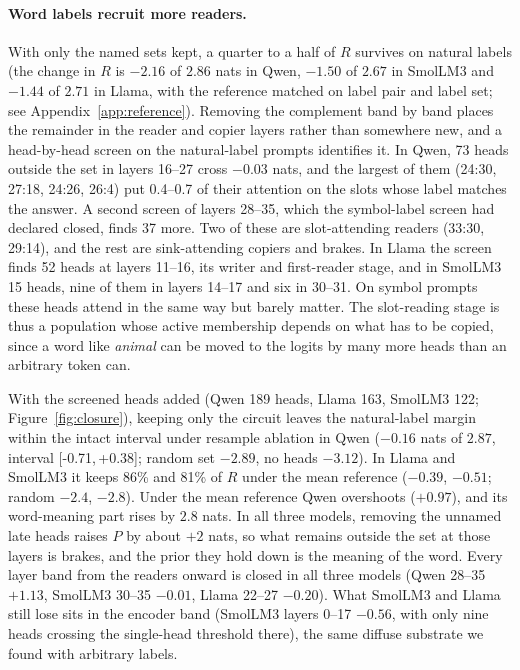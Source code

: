 \documentclass{article}
\newcommand{\ci}[2]{[#1,\,#2]}
\begin{document}
\paragraph{Word labels recruit more readers.} With only the named sets kept, a quarter to a half of $R$ survives on natural labels (the change in $R$ is $-2.16$ of $2.86$ nats in Qwen, $-1.50$ of $2.67$ in SmolLM3 and $-1.44$ of $2.71$ in Llama, with the reference matched on label pair and label set; see Appendix~\ref{app:reference}). Removing the complement band by band places the remainder in the reader and copier layers rather than somewhere new, and a head-by-head screen on the natural-label prompts identifies it. In Qwen, 73 heads outside the set in layers 16--27 cross $-0.03$ nats, and the largest of them (24:30, 27:18, 24:26, 26:4) put 0.4--0.7 of their attention on the slots whose label matches the answer. A second screen of layers 28--35, which the symbol-label screen had declared closed, finds 37 more. Two of these are slot-attending readers (33:30, 29:14), and the rest are sink-attending copiers and brakes. In Llama the screen finds 52 heads at layers 11--16, its writer and first-reader stage, and in SmolLM3 15 heads, nine of them in layers 14--17 and six in 30--31. On symbol prompts these heads attend in the same way but barely matter. The slot-reading stage is thus a population whose active membership depends on what has to be copied, since a word like \emph{animal} can be moved to the logits by many more heads than an arbitrary token can.

With the screened heads added (Qwen 189 heads, Llama 163, SmolLM3 122; Figure~\ref{fig:closure}), keeping only the circuit leaves the natural-label margin within the intact interval under resample ablation in Qwen ($-0.16$ nats of $2.87$, interval \ci{-0.71}{+0.38}; random set $-2.89$, no heads $-3.12$). In Llama and SmolLM3 it keeps 86\% and 81\% of $R$ under the mean reference ($-0.39$, $-0.51$; random $-2.4$, $-2.8$). Under the mean reference Qwen overshoots ($+0.97$), and its word-meaning part rises by $2.8$ nats. In all three models, removing the unnamed late heads raises $P$ by about $+2$ nats, so what remains outside the set at those layers is brakes, and the prior they hold down is the meaning of the word. Every layer band from the readers onward is closed in all three models (Qwen 28--35 $+1.13$, SmolLM3 30--35 $-0.01$, Llama 22--27 $-0.20$). What SmolLM3 and Llama still lose sits in the encoder band (SmolLM3 layers 0--17 $-0.56$, with only nine heads crossing the single-head threshold there), the same diffuse substrate we found with arbitrary labels.
\end{document}
